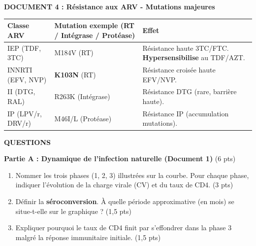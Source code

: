 \documentclass[11pt]{article}
\begin{document}
\begin{exercice}
\vspace{0.5cm}
\textbf{DOCUMENT 4 : Résistance aux ARV - Mutations majeures}
\begin{center}
\begin{tabularx}{\linewidth}{|l|X|X|}\hline
\textbf{Classe ARV} & \textbf{Mutation exemple (RT / Intégrase / Protéase)} & \textbf{Effet} \\ \hline
IEP (TDF, 3TC) & M184V (RT) & Résistance haute 3TC/FTC. \textbf{Hypersensibilise} au TDF/AZT. \\ \hline
INNRTI (EFV, NVP) & \textbf{K103N} (RT) & Résistance croisée haute EFV/NVP. \\ \hline
II (DTG, RAL) & R263K (Intégrase) & Résistance DTG (rare, barrière haute). \\ \hline
IP (LPV/r, DRV/r) & M46I/L (Protéase) & Résistance IP (accumulation mutations). \\ \hline
\end{tabularx}
\end{center}

\vspace{0.5cm}
\textbf{QUESTIONS}

\textbf{Partie A : Dynamique de l'infection naturelle (Document 1)} \hfill (6 pts)
\begin{enumerate}
\item Nommer les trois phases (1, 2, 3) illustrées sur la courbe. Pour chaque phase, indiquer l'évolution de la charge virale (CV) et du taux de CD4. \hfill (3 pts)
\item Définir la \textbf{séroconversion}. À quelle période approximative (en mois) se situe-t-elle sur le graphique ? \hfill (1,5 pts)
\item Expliquer pourquoi le taux de CD4 finit par s'effondrer dans la phase 3 malgré la réponse immunitaire initiale. \hfill (1,5 pts)
\end{enumerate}


\end{exercice}
\end{document}
